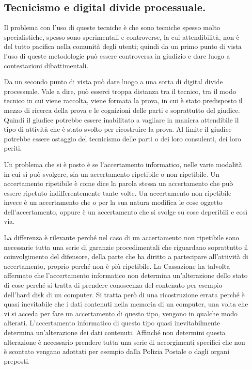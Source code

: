 \subsection{Tecnicismo e digital divide processuale.}

Il problema con l'uso di queste tecniche è che sono tecniche spesso molto specialistiche, spesso sono sperimentali e controverse, la cui attendibilità, non è del tutto pacifica nella comunità degli utenti; quindi da un primo punto di vista l'uso di queste metodologie può essere controversa in giudizio e dare luogo a contestazioni dibattimentali. 

Da un secondo punto di vista può dare luogo a una sorta di digital divide processuale. Vale a dire, può esserci troppa distanza tra il tecnico, tra il modo tecnico in cui viene raccolta, viene formata la prova, in cui è stato predisposto il mezzo di ricerca della prova e le cognizioni delle parti e soprattutto del giudice. Quindi il giudice potrebbe essere inabilitato a vagliare in maniera attendibile il tipo di attività che è stato svolto per ricostruire la prova. Al limite il giudice potrebbe essere ostaggio del tecnicismo delle parti o dei loro consulenti, dei loro periti. 

Un problema che si è posto è se l'accertamento informatico, nelle varie modalità in cui si può svolgere, sia un accertamento ripetibile o non ripetibile. Un accertamento ripetibile è come dice la parola stessa un accertamento che può essere ripetuto indifferentemente tante volte. Un accertamento non ripetibile invece è un accertamento che o per la sua natura modifica le cose  oggetto dell'accertamento, oppure è un accertamento che si svolge su cose deperibili e così via. 

La differenza è rilevante perché nel caso di un accertamento non ripetibile sono necessarie tutta una serie di garanzie procedimentali che riguardano soprattutto il coinvolgimento del difensore, della parte che ha diritto a partecipare all'attività di accertamento, proprio perché non è più ripetibile. La Cassazione ha talvolta affermato che l'accertamento informatico non determina un'alterazione dello stato di cose perché si tratta di prendere conoscenza del contenuto per esempio dell'hard disk di un computer. 
Si tratta però di una ricostruzione errata perché è quasi inevitabile che i dati contenuti nella memoria di un computer, una volta che vi si acceda per fare un accertamento di questo tipo, vengono in qualche modo alterati. L'accertamento informatico di questo tipo quasi inevitabilmente determina un'alterazione dei dati contenuti. Affinché non determini questa alterazione è necessario prendere tutta una serie di accorgimenti specifici che non è scontato vengano adottati per esempio dalla Polizia Postale o dagli organi preposti. 


